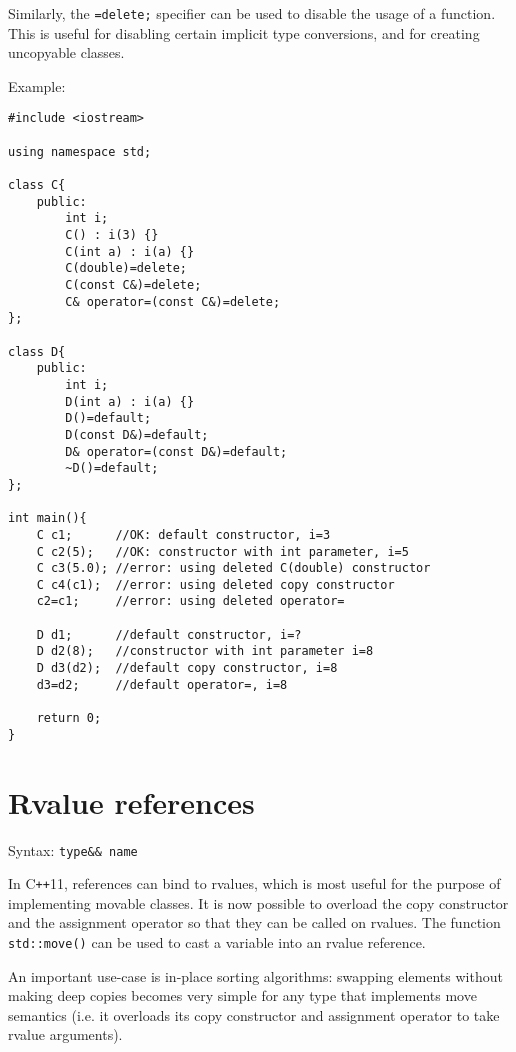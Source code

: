 \documentclass[12pt,a4paper]{article}
\begin{document}
Similarly, the \lstinline[style=CPP_CODE]|=delete;| specifier can be used to disable the usage of a function. This is useful for disabling certain implicit type conversions, and for creating uncopyable classes.

Example:
\vspace{10pt}
\lstset{style=CPP_CODE}
\begin{lstlisting}
#include <iostream>

using namespace std;

class C{
    public:
        int i;
        C() : i(3) {}
        C(int a) : i(a) {}
        C(double)=delete;
        C(const C&)=delete;
        C& operator=(const C&)=delete;
};

class D{
    public:
        int i;
        D(int a) : i(a) {}
        D()=default;
        D(const D&)=default;
        D& operator=(const D&)=default;
        ~D()=default;
};

int main(){
    C c1;      //OK: default constructor, i=3
    C c2(5);   //OK: constructor with int parameter, i=5
    C c3(5.0); //error: using deleted C(double) constructor
    C c4(c1);  //error: using deleted copy constructor
    c2=c1;     //error: using deleted operator=

    D d1;      //default constructor, i=?
    D d2(8);   //constructor with int parameter i=8
    D d3(d2);  //default copy constructor, i=8
    d3=d2;     //default operator=, i=8

    return 0;
}
\end{lstlisting}


\section{Rvalue references}

Syntax: \lstinline[language=none]|type&& name|

In C\texttt{++}11, references can bind to rvalues, which is most useful for the purpose of implementing movable classes. It is now possible to overload the copy constructor and the assignment operator so that they can be called on rvalues. The function \lstinline[language=none]|std::move()| can be used to cast a variable into an rvalue reference.

An important use-case is in-place sorting algorithms: swapping elements without making deep copies becomes very simple for any type that implements move semantics (i.e. it overloads its copy constructor and assignment operator to take rvalue arguments).
\end{document}
